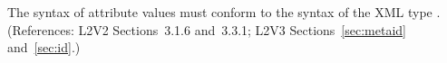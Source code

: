 The syntax of  attribute values must conform to the syntax of the
XML type .  (References: L2V2 Sections~3.1.6 and~3.3.1;
L2V3 Sections~\ref{sec:metaid} and~\ref{sec:id}.)
